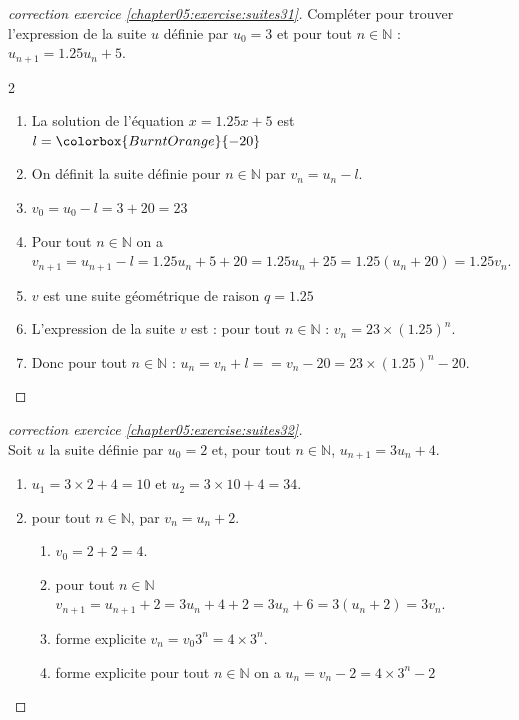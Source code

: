 \documentclass[main.tex]{subfiles}
\begin{document}
\begin{proof}[correction exercice \ref{chapter05:exercise:suites31}] Compléter pour trouver l'expression de la suite $u$ définie par $u_0=3$ et pour tout $n\in\mathbb{N}$ : $u_{n+1}=1.25 u_n + 5$. 
\begin{spacing}{2}
	\begin{enumerate}[label={},leftmargin=*]
		\item La solution de l'équation $x=1.25 x+5$ est  $l= \colorbox{BurntOrange}{-20} $  
		\item On définit la suite définie pour $n\in\mathbb{N}$ par $v_{n}=u_{n}-l$. 
	 	\item  \colorbox{BurntOrange}{ $v_0=u_{0}-l= 3+20=23  $}
		\item Pour tout $n\in\mathbb{N}$ on a \colorbox{BurntOrange}{ $ v_{n+1}=u_{n+1}-l= 1.25u_n + 5 +20 = 1.25u_n+ 25 = 1.25(u_n+20)=1.25v_n$}.
		\item  $v$ est une suite \colorbox{BurntOrange}{géométrique} de raison \colorbox{BurntOrange}{$q=1.25$}  
		\item L'expression de la suite $v$ est : pour tout $n\in\mathbb{N}$ : \colorbox{BurntOrange}{$v_n=23\times (1.25)^{n}$}. 
		\item Donc pour tout $n\in\mathbb{N}$ : \colorbox{BurntOrange}{$u_n= v_n + l = =v_n-20=23\times (1.25)^{n}-20 $}.
	\end{enumerate}
\end{spacing}
\end{proof}
\begin{proof}[correction exercice \ref{chapter05:exercise:suites32}] \hfill \\
Soit $u$ la suite définie par $u_0=2$ et, pour tout $n \in \mathbb{N}$, $u_{n+1}=3u_n+4$.
\begin{enumerate}[label=\arabic*),leftmargin=*] 
	\item \colorbox{BurntOrange}{$u_1=3\times 2+4=10$ et $u_2=3\times 10+4=34$}.
	\item  pour tout $n \in \mathbb{N}$, par $v_n = u_n +2$.
	\begin{enumerate}[label=\alph*),leftmargin=*] 
		\item  \colorbox{BurntOrange}{$v_0=2+2=4$}.
		\item  
		\colorbox{BurntOrange}{pour tout $n\in\mathbb{N}$ $v_{n+1}=u_{n+1}+2=3u_n+4+2=3u_n+6=3(u_n+2)=3v_n$}.
		\item \colorbox{BurntOrange}{forme explicite $v_n=v_0 3^n=4\times 3^n$}.
		\item \colorbox{BurntOrange}{forme explicite pour tout $n\in\mathbb{N}$ on a $u_n=v_n-2=4\times 3^n-2$} 
	\end{enumerate}
\end{enumerate}
\end{proof} 
\end{document}

